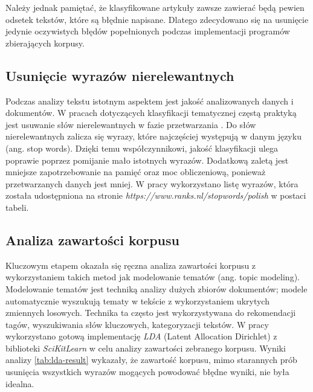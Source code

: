 Należy jednak pamiętać, że klasyfikowane artykuły zawsze zawierać będą pewien odsetek tekstów, które są błędnie napisane. Dlatego zdecydowano się na usunięcie jedynie oczywistych błędów popełnionych podczas implementacji programów zbierających korpusy.

\subsection{Usunięcie wyrazów nierelewantnych}
Podczas analizy tekstu istotnym aspektem jest jakość analizowanych danych i dokumentów. W pracach dotyczących klasyfikacji tematycznej częstą praktyką jest usuwanie słów nierelewantnych w fazie przetwarzania  \cite{introInfoRetrieval}\cite{indeksowanietresci}\cite{mykowiecka}. Do słów nierelewantnych zalicza się wyrazy, które najczęściej występują w danym języku (ang. stop words). Dzięki temu współczynnikowi, jakość klasyfikacji ulega poprawie poprzez pomijanie mało istotnych wyrazów. Dodatkową zaletą jest mniejsze zapotrzebowanie na pamięć oraz moc obliczeniową, ponieważ przetwarzanych danych jest mniej. W pracy wykorzystano listę wyrazów, która została udostępniona na stronie \textit{https://www.ranks.nl/stopwords/polish} \cite{polishStopwords} w postaci tabeli.

\subsection{Analiza zawartości korpusu}
Kluczowym etapem okazała się ręczna analiza zawartości korpusu z wykorzystaniem takich metod jak modelowanie tematów (ang. topic modeling). Modelowanie tematów jest techniką analizy dużych zbiorów dokumentów; modele automatycznie wyszukują tematy w tekście z wykorzystaniem ukrytych zmiennych losowych. Technika ta często jest wykorzystywana do rekomendacji tagów, wyszukiwania słów kluczowych, kategoryzacji tekstów. \cite{about-lda} W pracy wykorzystano gotową implementację \textit{LDA} (Latent Allocation Dirichlet) z biblioteki \textit{SciKitLearn} w celu analizy zawartości zebranego korpusu. Wyniki analizy \ref{tab:lda-result} wykazały, że zawartość korpusu, mimo starannych prób usunięcia wszystkich wyrazów mogących powodować błędne wyniki, nie była idealna.



